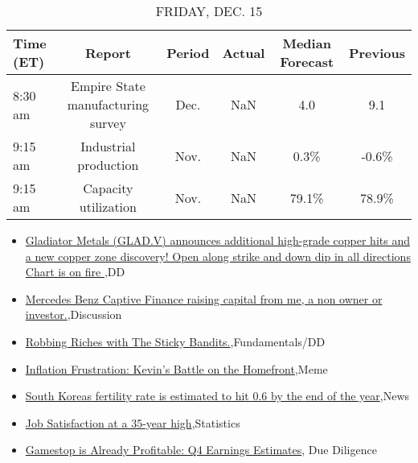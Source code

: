\documentclass{article}%
\begin{document}
%


\begin{table}[htbp]%
\caption{FRIDAY, DEC. 15}%
\centering%
\begin{adjustbox}{width=1\textwidth}%
\begin{tabular}{lccccc}
\toprule
Time (ET) &                            Report & Period & Actual & Median Forecast & Previous \\
\midrule
  8:30 am & Empire State manufacturing survey &   Dec. &    NaN &             4.0 &      9.1 \\
  9:15 am &             Industrial production &   Nov. &    NaN &            0.3\% &    -0.6\% \\
  9:15 am &              Capacity utilization &   Nov. &    NaN &           79.1\% &    78.9\% \\
\bottomrule
\end{tabular}
%
\end{adjustbox}%
\end{table}

%
\begin{itemize}%
\item%
\href{https://reddit.com/r/Baystreetbets/comments/18g0apa/gladiator\_metals\_gladv\_announces\_additional/}{Gladiator Metals (GLAD.V) announces additional high-grade copper hits and a new copper zone discovery! Open along strike and down dip in all directions Chart is on fire },DD%
\item%
\href{https://reddit.com/r/StockMarket/comments/18gasge/mercedes\_benz\_captive\_finance\_raising\_capital/}{Mercedes Benz Captive Finance raising capital from me, a non owner or investor.},Discussion%
\item%
\href{https://reddit.com/r/StockMarket/comments/18g7ytb/robbing\_riches\_with\_the\_sticky\_bandits/}{Robbing Riches with The Sticky Bandits.},Fundamentals/DD%
\item%
\href{https://reddit.com/r/StockMarket/comments/18fxr7q/inflation\_frustration\_kevins\_battle\_on\_the/}{Inflation Frustration: Kevin's Battle on the Homefront},Meme%
\item%
\href{https://reddit.com/r/Economics/comments/18gg4wo/south\_koreas\_fertility\_rate\_is\_estimated\_to\_hit/}{South Koreas fertility rate is estimated to hit 0.6 by the end of the year},News%
\item%
\href{https://reddit.com/r/Economics/comments/18gbhj9/job\_satisfaction\_at\_a\_35year\_high/}{Job Satisfaction at a 35-year high},Statistics%
\item%
\href{https://reddit.com/r/Superstonk/comments/18ge6ds/gamestop\_is\_already\_profitable\_q4\_earnings/}{Gamestop is Already Profitable: Q4 Earnings Estimates}, Due Diligence%
\end{itemize}%
\end{document}
